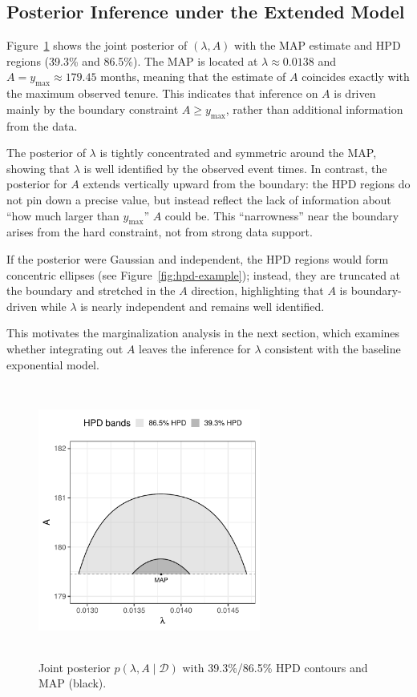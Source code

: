 \subsection{Posterior Inference under the Extended Model}
\label{res:post_contour}
Figure~\ref{fig:contour} shows the joint posterior of $(\lambda, A)$ with the MAP estimate and HPD regions (39.3\% and 86.5\%). The MAP is located at $\lambda \approx 0.0138$ and $A = y_{\max} \approx 179.45$ months, meaning that the estimate of $A$ coincides exactly with the maximum observed tenure. This indicates that inference on $A$ is driven mainly by the boundary constraint $A \geq y_{\max}$, rather than additional information from the data.

The posterior of $\lambda$ is tightly concentrated and symmetric around the MAP, showing that $\lambda$ is well identified by the observed event times. In contrast, the posterior for $A$ extends vertically upward from the boundary: the HPD regions do not pin down a precise value, but instead reflect the lack of information about “how much larger than $y_{\max}$” $A$ could be. This “narrowness” near the boundary arises from the hard constraint, not from strong data support.

If the posterior were Gaussian and independent, the HPD regions would form concentric ellipses (see Figure~\ref{fig:hpd-example}); instead, they are truncated at the boundary and stretched in the $A$ direction, highlighting that $A$ is boundary-driven while $\lambda$ is nearly independent and remains well identified.

This motivates the marginalization analysis in the next section, which examines whether integrating out $A$ leaves the inference for $\lambda$ consistent with the baseline exponential model.
\begin{figure}[H]
    \centering
    \includegraphics[height=9cm, width=0.65\textwidth]{images/post_contour.pdf}
    \caption{{\small Joint posterior $p(\lambda,A\mid\mathcal D)$ with 39.3\%/86.5\% HPD contours and MAP (black).}}
    \label{fig:contour}
\end{figure}



